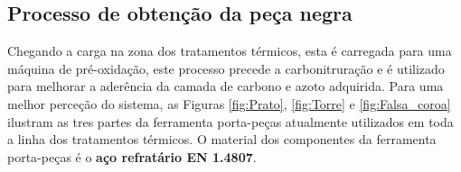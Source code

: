 \subsection{Processo de obtenção da peça negra} \label{ssec:materiais_CS_carbonitruracao}
Chegando a carga na zona dos tratamentos térmicos, esta é carregada para uma máquina de pré-oxidação, este processo precede a carbonitruração e é utilizado para melhorar a aderência da camada de carbono e azoto adquirida. Para uma melhor perceção do sistema, as Figuras \ref{fig:Prato}, \ref{fig:Torre} e \ref{fig:Falsa_coroa} ilustram as tres partes da ferramenta porta-peças atualmente utilizados em toda a linha dos tratamentos térmicos. O material dos componentes da ferramenta porta-peças é o \textbf{aço refratário EN 1.4807}.

